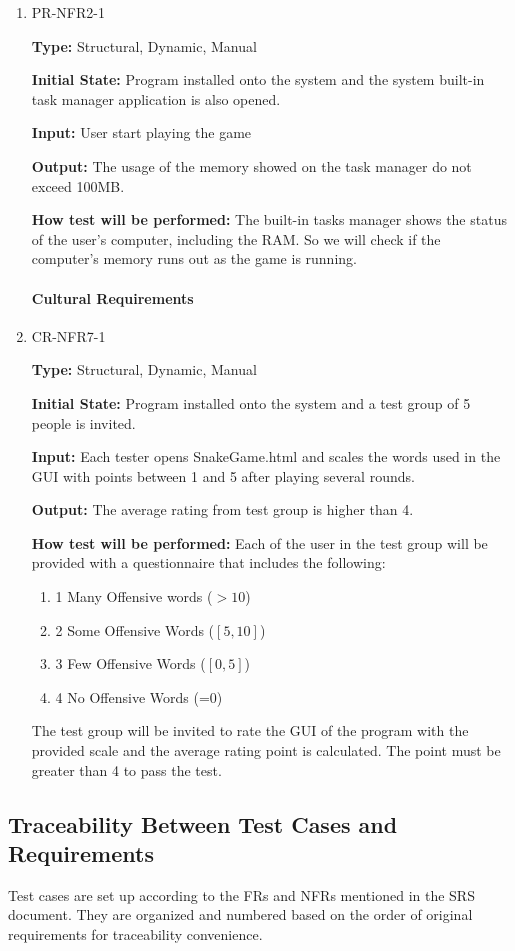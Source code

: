 \documentclass[12pt, titlepage]{article}
\begin{document}
\begin{enumerate}
\item{PR-NFR2-1}

\textbf{Type:} Structural, Dynamic, Manual

\textbf{Initial State:} Program installed onto the system and the system built-in task manager application is also opened.

\textbf{Input:} User start playing the game

\textbf{Output:} The usage of the memory showed on the task manager do not exceed 100MB.

\textbf{How test will be performed:} The built-in tasks manager shows the status of the user's computer, including the RAM. So we will check if the computer's memory runs out as the game is running.

\paragraph{Cultural Requirements}

\item{CR-NFR7-1}

\textbf{Type:} Structural, Dynamic, Manual

\textbf{Initial State:}  Program installed onto the system and a test group of 5 people is invited.

\textbf{Input:} Each tester opens SnakeGame.html and scales the words used in the GUI with points between 1 and 5 after playing several rounds.

\textbf{Output:} The average rating from test group is higher than 4.

\textbf{How test will be performed:} Each of the user in the test group will be provided with a questionnaire that includes the following:
\begin{enumerate}
    \item 1 Many Offensive words ($> 10$)
    \item 2 Some Offensive Words ($[5,10]$)
    \item 3 Few Offensive Words ($[0,5]$)
    \item 4 No Offensive Words (=0)
\end{enumerate}
The test group will be invited to rate the GUI of the program with the provided scale and the average rating point is calculated. The point must be greater than 4 to pass the test.
\end{enumerate}
\subsection{Traceability Between Test Cases and Requirements}
Test cases are set up according to the FRs and NFRs mentioned in the SRS document. They are organized and numbered based on the order of original requirements for traceability convenience. 
\end{document}
